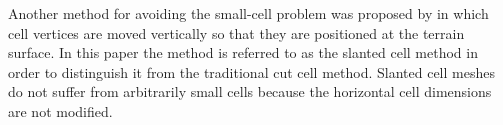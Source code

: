 Another method for avoiding the small-cell problem was proposed by \citep{shaw-weller2016} in which cell vertices are moved vertically so that they are positioned at the terrain surface.  In this paper the method is referred to as the slanted cell method in order to distinguish it from the traditional cut cell method.  Slanted cell meshes do not suffer from arbitrarily small cells because the horizontal cell dimensions are not modified.


%




